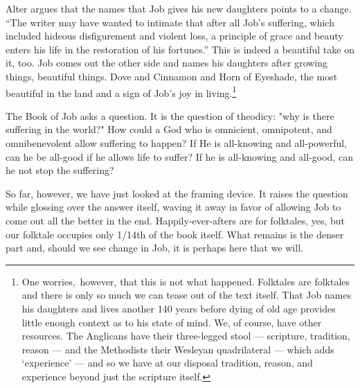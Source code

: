 Alter argues that the names that Job gives his new daughters points to a change. ``The writer may have wanted to intimate that after all Job's suffering, which included hideous disfigurement and violent loss, a principle of grace and beauty enters his life in the restoration of his fortunes.'' \parencite[579]{alter} This is indeed a beautiful take on it, too. Job comes out the other side and names his daughters after growing things, beautiful things. Dove and Cinnamon and Horn of Eyeshade, the most beautiful in the land and a sign of Job's joy in living.\footnote{One worries,\footnotemark~however, that this is not what happened. Folktales are folktales and there is only so much we can tease out of the text itself. That Job names his daughters and lives another 140 years before dying of old age provides little enough context as to his state of mind. We, of course, have other resources. The Anglicans have their three-legged stool --- scripture, tradition, reason --- and the Methodists their Wesleyan quadrilateral --- which adds `experience' --- and so we have at our disposal tradition, reason, and experience beyond just the scripture itself.}

The Book of Job asks a question. It is the question of theodicy: "why is there suffering in the world?" How could a God who is omnicient, omnipotent, and omnibenevolent allow suffering to happen? If He is all-knowing and all-powerful, can he be all-good if he allows life to suffer? If he is all-knowing and all-good, can he not stop the suffering?

So far, however, we have just looked at the framing device. It raises the question while glossing over the answer itself, waving it away in favor of allowing Job to come out all the better in the end. Happily-ever-afters are for folktales, yes, but our folktale occupies only 1/14th of the book itself. What remains is the denser part and, should we see change in Job, it is perhaps here that we will.
